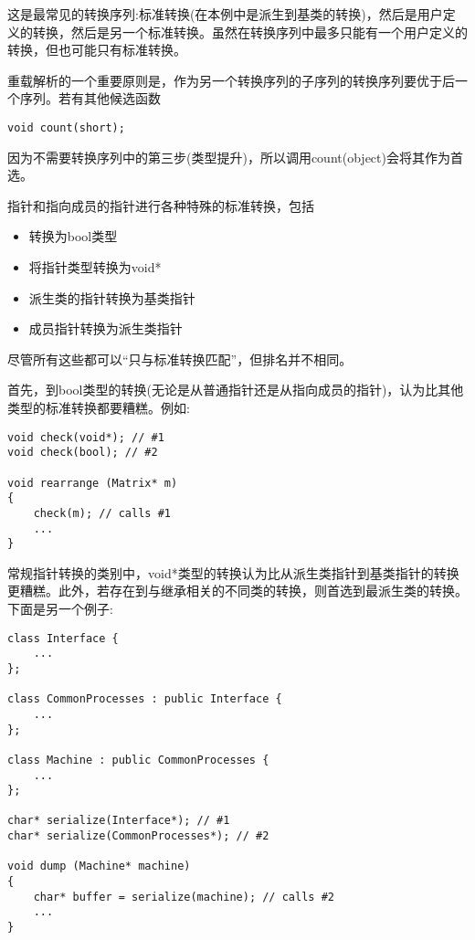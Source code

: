 这是最常见的转换序列:标准转换(在本例中是派生到基类的转换)，然后是用户定义的转换，然后是另一个标准转换。虽然在转换序列中最多只能有一个用户定义的转换，但也可能只有标准转换。

重载解析的一个重要原则是，作为另一个转换序列的子序列的转换序列要优于后一个序列。若有其他候选函数

\begin{lstlisting}[style=styleCXX]
void count(short);
\end{lstlisting}

因为不需要转换序列中的第三步(类型提升)，所以调用count(object)会将其作为首选。


指针和指向成员的指针进行各种特殊的标准转换，包括

\begin{itemize}
\item 
转换为bool类型

\item 
将指针类型转换为void*

\item 
派生类的指针转换为基类指针

\item 
成员指针转换为派生类指针
\end{itemize}

尽管所有这些都可以“只与标准转换匹配”，但排名并不相同。

首先，到bool类型的转换(无论是从普通指针还是从指向成员的指针)，认为比其他类型的标准转换都要糟糕。例如:

\begin{lstlisting}[style=styleCXX]
void check(void*); // #1
void check(bool); // #2

void rearrange (Matrix* m)
{
	check(m); // calls #1
	...
}
\end{lstlisting}

常规指针转换的类别中，void*类型的转换认为比从派生类指针到基类指针的转换更糟糕。此外，若存在到与继承相关的不同类的转换，则首选到最派生类的转换。下面是另一个例子:

\begin{lstlisting}[style=styleCXX]
class Interface {
	...
};

class CommonProcesses : public Interface {
	...
};

class Machine : public CommonProcesses {
	...
};

char* serialize(Interface*); // #1
char* serialize(CommonProcesses*); // #2

void dump (Machine* machine)
{
	char* buffer = serialize(machine); // calls #2
	...
}
\end{lstlisting}

